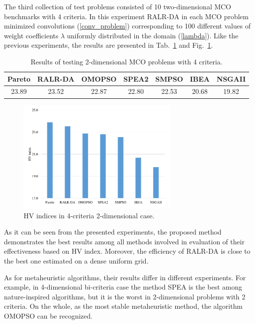 \documentclass[runningheads]{llncs}
\begin{document}
The third collection of test problems consisted of 10 two-dimensional MCO benchmarks with 4 criteria. In this experiment RALR-DA in each MCO problem minimized convolutions (\ref{conv_problem}) corresponding to 100 different values of weight coefficients $\lambda$ uniformly distributed in the domain (\ref{lambda}).
Like  the  previous experiments, the results are presented in Tab.~\ref{tab3} and Fig.~\ref{fig5}.

\begin{table}
\caption{Results of testing 2-dimensional MCO problems with 4 criteria.}
\centering
\begin{tabular}{ccccccc} \hline
 Pareto & RALR-DA & OMOPSO & SPEA2 & SMPSO & IBEA & NSGAII   \\ \hline
  23.89 & 23.52 & 22.87 & 22.80 & 22.53 & 20.68 & 19.82 \\ \hline
\end{tabular}
\label{tab3}
\end{table}

\begin{figure}
\centering
\includegraphics[width=0.7\textwidth]{fig5.pdf} 
\caption{HV indices in 4-criteria 2-dimensional case.}\label{fig5} 
\end{figure}

As it can be seen from the presented experiments, the proposed method demonstrates the best results among all methods involved in evaluation of their effectiveness based on HV index. Moreover, the efficiency of RALR-DA is close to the best one estimated on a dense uniform grid.

As for metaheuristic algorithms, their results differ in different experiments.  For example, in 4-dimensional bi-criteria case the method SPEA is the best among nature-inspired algorithms, but it is the worst in 2-dimensional problems with 2 criteria. On the whole, as the most stable metaheuristic method, the algorithm OMOPSO can be recognized.
\end{document}
